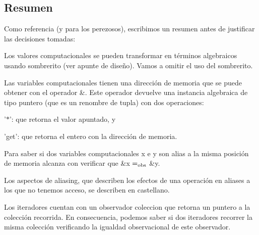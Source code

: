 \hypertarget{Aliasing_sec-Resumen}{}\subsection{Resumen}\label{Aliasing_sec-Resumen}
Como referencia (y para los perezosos), escribimos un resumen antes de justificar las decisiones tomadas\-:
\begin{DoxyItemize}
\item Los valores computacionales se pueden transformar en términos algebraicos usando sombrerito (ver apunte de diseño). Vamos a omitir el uso del sombrerito.
\item Las variables computacionales tienen una dirección de memoria que se puede obtener con el operador \&. Este operador devuelve una instancia algebraica de tipo puntero (que es un renombre de tupla) con dos operaciones\-:
\begin{DoxyEnumerate}
\item '$\ast$'\-: que retorna el valor apuntado, y
\item 'get'\-: que retorna el entero con la dirección de memoria.
\end{DoxyEnumerate}
\item Para saber si dos variables computacionales {\ttfamily x} e {\ttfamily y} son alias a la misma posición de memoria alcanza con verificar que \&{\ttfamily x} $=_{\rm obs}$ \&{\ttfamily y}.
\item Los aspectos de aliasing, que describen los efectos de una operación en aliases a los que no tenemos acceso, se describen en castellano.
\item Los iteradores cuentan con un observador {\ttfamily coleccion} que retorna un puntero a la colección recorrida. En consecuencia, podemos saber si dos iteradores recorrer la misma colección verificando la igualdad observacional de este observador.
\end{DoxyItemize}

